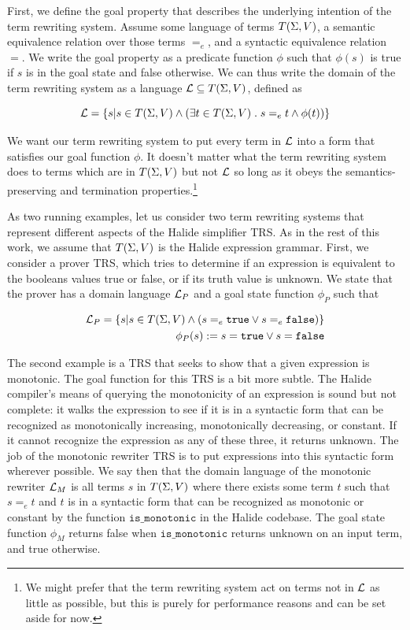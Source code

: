 First, we define the goal property that describes the underlying intention of the term rewriting system. Assume some language of terms $T(\Sigma,V)$, a semantic equivalence relation over those terms $=_e$, and a syntactic equivalence relation $=$. We write the goal property as a predicate function $\phi$ such that $\phi(s)$ is true if $s$ is in the goal state and false otherwise. We can thus write the domain of the term rewriting system as a language $\mathcal{L} \subseteq T(\Sigma,V)$, defined as

\[
\mathcal{L} = \{s | s \in T(\Sigma,V) \wedge (\exists t \in T(\Sigma,V)\;.\; s =_e t \wedge \phi(t))\}
\]

We want our term rewriting system to put every term in $\mathcal{L}$ into a form that satisfies our goal function $\phi$. It doesn't matter what the term rewriting system does to terms which are in $T(\Sigma,V)$ but not $\mathcal{L}$ so long as it obeys the semantics-preserving and termination properties.\footnote{We might prefer that the term rewriting system act on terms not in $\mathcal{L}$ as little as possible, but this is purely for performance reasons and can be set aside for now.}

As two running examples, let us consider two term rewriting systems that represent different aspects of the Halide simplifier TRS. As in the rest of this work, we assume that $T(\Sigma,V)$ is the Halide expression grammar. First, we consider a prover TRS, which tries to determine if an expression is equivalent to the booleans values true or false, or if its truth value is unknown. We state that the prover has a domain language $\mathcal{L}_P$ and a goal state function $\phi_P$ such that

\begin{align*}
    \mathcal{L}_P = \{s | s \in T(\Sigma,V) \wedge (s =_e \texttt{true} \vee s =_e \texttt{false})\} \\
    \phi_P(s) := s = \texttt{true} \vee s = \texttt{false}
\end{align*}

The second example is a TRS that seeks to show that a given expression is monotonic. The goal function for this TRS is a bit more subtle. The Halide compiler's means of querying the monotonicity of an expression is sound but not complete: it walks the expression to see if it is in a syntactic form that can be recognized as monotonically increasing, monotonically decreasing, or constant. If it cannot recognize the expression as any of these three, it returns unknown. The job of the monotonic rewriter TRS is to put expressions into this syntactic form wherever possible. We say then that the domain language of the monotonic rewriter $\mathcal{L}_M$ is all terms $s$ in $T(\Sigma,V)$ where there exists some term $t$ such that $s =_e t$ and $t$ is in a syntactic form that can be recognized as monotonic or constant by the function $\texttt{is_monotonic}$ in the Halide codebase. The goal state function $\phi_M$ returns false when $\texttt{is_monotonic}$ returns unknown on an input term, and true otherwise.

